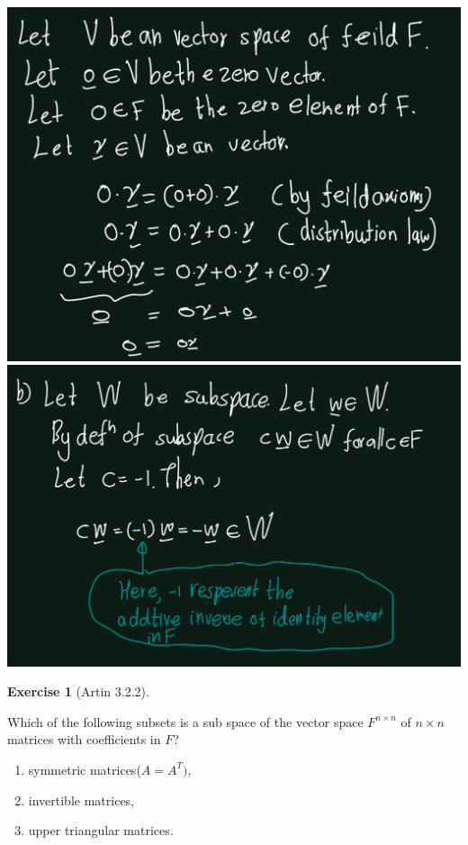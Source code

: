 \documentclass[
]{book}
\providecommand{\tightlist}{%
  \setlength{\itemsep}{0pt}\setlength{\parskip}{0pt}}
\theoremstyle{definition}
\theoremstyle{definition}
\theoremstyle{definition}
\newtheorem{exercise}{Exercise}[chapter]
\theoremstyle{definition}
\theoremstyle{remark}
\begin{document}
\includegraphics{figures/ch_3/ex-2.1-a.png}
\includegraphics{figures/ch_3/ex-2.1-b.png}

\begin{exercise}[Artin 3.2.2]
\protect\hypertarget{exr:unnamed-chunk-279}{}\label{exr:unnamed-chunk-279}

Which of the following subsets is a sub space of the vector space \(F^{n\times n}\) of \(n\times n\) matrices with coefficients in \(F\)?

\begin{enumerate}
\def\labelenumi{(\alph{enumi})}
\tightlist
\item
  symmetric matrices(\(A = A^T)\),
\item
  invertible matrices,
\item
  upper triangular matrices.
\end{enumerate}

\end{exercise}
\end{document}
